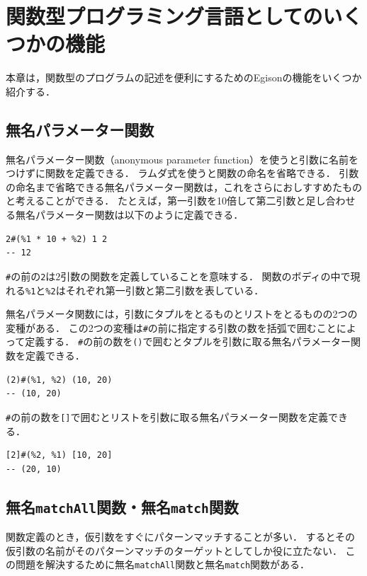 \chapter{関数型プログラミング言語としてのいくつかの機能}\label{etc}

本章は，関数型のプログラムの記述を便利にするためのEgisonの機能をいくつか紹介する．

\section{無名パラメーター関数}

無名パラメーター関数（anonymous parameter function）を使うと引数に名前をつけずに関数を定義できる．
ラムダ式を使うと関数の命名を省略できる．
引数の命名まで省略できる無名パラメーター関数は，これをさらにおしすすめたものと考えることができる．
たとえば，第一引数を10倍して第二引数と足し合わせる無名パラメーター関数は以下のように定義できる．
\begin{lstlisting}[language=egison,numbers=none]
2#(%1 * 10 + %2) 1 2
-- 12
\end{lstlisting}
\lstinline{#}の前の\lstinline{2}は$2$引数の関数を定義していることを意味する．
関数のボディの中で現れる\lstinline{%1}と\lstinline{%2}はそれぞれ第一引数と第二引数を表している．

無名パラメータ関数には，引数にタプルをとるものとリストをとるものの2つの変種がある．
この2つの変種は\lstinline{#}の前に指定する引数の数を括弧で囲むことによって定義する．
\lstinline{#}の前の数を\lstinline{()}で囲むとタプルを引数に取る無名パラメーター関数を定義できる．
\begin{lstlisting}[language=egison,numbers=none]
(2)#(%1, %2) (10, 20)
-- (10, 20)
\end{lstlisting}
\lstinline{#}の前の数を\lstinline{[]}で囲むとリストを引数に取る無名パラメーター関数を定義できる．
\begin{lstlisting}[language=egison,numbers=none]
[2]#(%2, %1) [10, 20]
-- (20, 10)
\end{lstlisting}

\section{無名\texttt{matchAll}関数・無名\texttt{match}関数}

関数定義のとき，仮引数をすぐにパターンマッチすることが多い．
するとその仮引数の名前がそのパターンマッチのターゲットとしてしか役に立たない．
この問題を解決するために無名\lstinline{matchAll}関数と無名\lstinline{match}関数がある．

